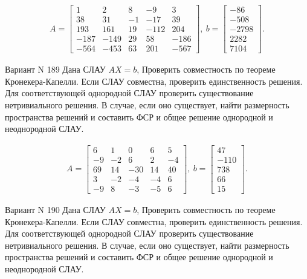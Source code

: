 \documentclass[11pt]{report}
\begin{document}
\begin{align*}
 A = \left[\begin{matrix}1 & 2 & 8 & -9 & 3\\38 & 31 & -1 & -17 & 39\\193 & 161 & 19 & -112 & 204\\-187 & -149 & 29 & 58 & -186\\-564 & -453 & 63 & 201 & -567\end{matrix}\right],
\ b = \left[\begin{matrix}-86\\-508\\-2798\\2282\\7104\end{matrix}\right]. 
 \end{align*}

Вариант N 189
Дана СЛАУ $AX = b$,
Проверить совместность по теореме Кронекера-Капелли. Если СЛАУ совместна, проверить единственность решения.
Для соответствующей однородной СЛАУ проверить существование нетривиального решения. В случае, если оно существует,
найти размерность пространства решений и составить ФСР и общее решение однородной  и неоднородной СЛАУ.


\begin{align*}
 A = \left[\begin{matrix}6 & 1 & 0 & 6 & 5\\-9 & -2 & 6 & 2 & -4\\69 & 14 & -30 & 14 & 40\\3 & -2 & -4 & -4 & 6\\-9 & 8 & -3 & -5 & 6\end{matrix}\right],
\ b = \left[\begin{matrix}47\\-110\\738\\66\\15\end{matrix}\right]. 
 \end{align*}

Вариант N 190
Дана СЛАУ $AX = b$,
Проверить совместность по теореме Кронекера-Капелли. Если СЛАУ совместна, проверить единственность решения.
Для соответствующей однородной СЛАУ проверить существование нетривиального решения. В случае, если оно существует,
найти размерность пространства решений и составить ФСР и общее решение однородной  и неоднородной СЛАУ.
\end{document}
